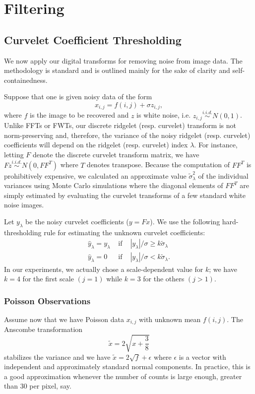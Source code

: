 
\chapter{Filtering}
\label{sec:filtering}
\section{Curvelet Coefficient Thresholding}
We now apply our digital transforms for
removing noise from image data. The methodology is standard and is
outlined mainly for the sake of clarity and self-containedness.

Suppose that one is given noisy data of the form
\[
x_{i,j} = f(i,j) + \sigma z_{i,j},
\]
where $f$ is the image to be recovered and $z$ is white noise, i.e.
$z_{i,j} \stackrel{i.i.d.}{\sim} N(0,1)$. Unlike FFTs or FWTs, our
discrete ridgelet (resp. curvelet) transform is not norm-preserving
and, therefore, the variance of the noisy ridgelet (resp. curvelet)
coefficients will depend on the ridgelet (resp. curvelet) index
$\lambda$.  For instance, letting $F$ denote the discrete curvelet
transform matrix, we have $F z \stackrel{i.i.d.}{\sim} N(0,F F^T)$
where $T$ denotes transpose.
Because the computation of $F F^T$ is prohibitively expensive, we
calculated an approximate value $\tilde{\sigma}^2_\lambda$ of the
individual variances using Monte Carlo simulations where the diagonal
elements of $F F^T$ are simply estimated by evaluating the curvelet
transforms of a few standard white noise images.

Let $y_\lambda$ be the noisy curvelet coefficients
($y = F x$). We use the following hard-thresholding rule
for estimating the unknown curvelet coefficients:
\begin{eqnarray}
\hat y_\lambda = y_\lambda  & \mbox{ if }  &
|y_\lambda|/\sigma \geq k \tilde{\sigma}_\lambda\\
\hat y_\lambda = 0 &  \mbox{ if } & |y_\lambda|/\sigma
<  k \tilde{\sigma}_\lambda.
\end{eqnarray}
In our experiments, we actually chose a scale-dependent value for $k$;
we have $k = 4$ for the first scale $(j = 1)$ while $k = 3$
for the others $(j > 1)$.

\subsection*{Poisson Observations}
Assume now that we have Poisson data $x_{i,j}$ with unknown mean
$f(i,j)$.  The Anscombe transformation \cite{rest:anscombe48}
\begin{equation}
\tilde{x} = 2\sqrt{x + \frac{3}{8}}
\end{equation}
stabilizes the variance and we have $\tilde{x} = 2 \sqrt{f} +
\epsilon$ where $\epsilon$ is a vector with independent and
approximately standard normal components. In practice, this is a good
approximation whenever the number of counts is large enough, greater
than 30 per pixel, say.
 
